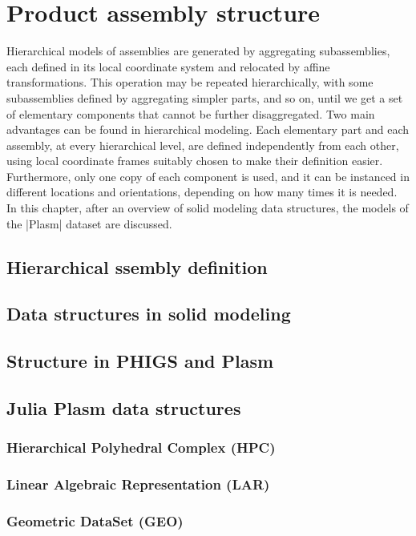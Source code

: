 
\chapter{Product assembly structure}
\label{chapt:6}

Hierarchical models of assemblies are generated by aggregating subassemblies, each defined in its local coordinate system and relocated by affine transformations. This operation may be repeated hierarchically, with some subassemblies defined by aggregating simpler parts, and so on, until we get a set of elementary components that cannot be further disaggregated.
Two main advantages can be found in hierarchical modeling. Each elementary part and each assembly, at every hierarchical level, are defined independently from each other, using local coordinate frames suitably chosen to make their definition easier. Furthermore, only one copy of each component is used, and it can be instanced in different locations and orientations, depending on how many times it is needed. In this chapter, after an overview of solid modeling data structures, the models of the |Plasm| dataset are discussed. 


\section{Hierarchical ssembly definition}\label{sect:6-1}


\section{Data structures in solid modeling}\label{sect:6-2}


\section{Structure in PHIGS and Plasm}\label{sect:6-3}


\section{Julia Plasm data structures}\label{sect:6-4}


\subsection{Hierarchical Polyhedral Complex (HPC)}\label{sect:6-4-1}


\subsection{Linear Algebraic Representation (LAR)}\label{sect:6-4-2}


\subsection{Geometric DataSet (GEO)}\label{sect:7-4-3}


